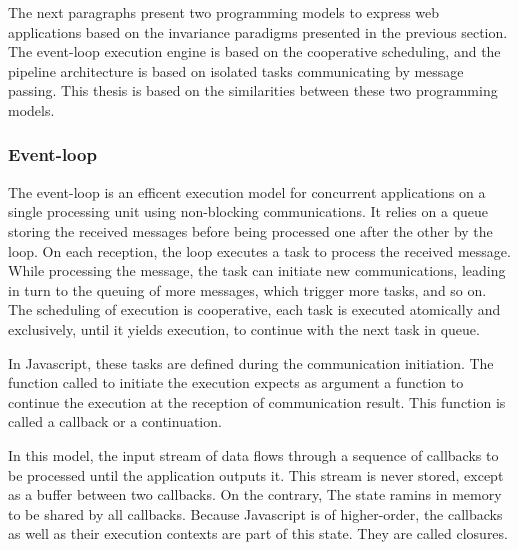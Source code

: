 The next paragraphs present two programming models to express web applications based on the invariance paradigms presented in the previous section.
The event-loop execution engine is based on the cooperative scheduling, and the pipeline architecture is based on isolated tasks communicating by message passing.
This thesis is based on the similarities between these two programming models.

\subsubsection{Event-loop}

The event-loop is an efficent execution model for concurrent applications on a single processing unit using non-blocking communications.
It relies on a queue storing the received messages before being processed one after the other by the loop.
On each reception, the loop executes a task to process the received message.
While processing the message, the task can initiate new communications, leading in turn to the queuing of more messages, which trigger more tasks, and so on.
The scheduling of execution is cooperative, each task is executed atomically and exclusively, until it yields execution, to continue with the next task in queue.



In Javascript, these tasks are defined during the communication initiation.
The function called to initiate the execution expects as argument a function to continue the execution at the reception of communication result.
This function is called a callback or a continuation.

In this model, the input stream of data flows through a sequence of callbacks to be processed until the application outputs it.
This stream is never stored, except as a buffer between two callbacks.
On the contrary, The state ramins in memory to be shared by all callbacks.
Because Javascript is of higher-order, the callbacks as well as their execution contexts are part of this state.
They are called closures.


